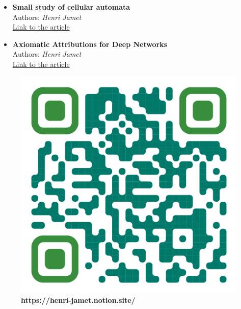 \begin{multicols}{2}
\begin{itemize}
  \item \textbf{Small study of cellular automata}\\
  Authors: \textit{Henri Jamet}\\
  \href{https://henri-jamet.notion.site/Small-study-of-cellular-automata-352e858c867e4cf3a960651f33738cb5}{Link to the article}
  
  \item \textbf{Axiomatic Attributions for Deep Networks}\\
  Authors: \textit{Henri Jamet}\\
  \href{https://henri-jamet.notion.site/Attributions-Axiomatiques-pour-les-R-seaux-Profonds-146fdf9f541b48738a7c60a2ad669ed8?pvs=4}{Link to the article}
\end{itemize}

\end{multicols}

\begin{figure}[h]
  \centering
  \begin{adjustbox}{max width=0.2\textwidth}
    \includegraphics{Img/QR.png}
  \end{adjustbox}
  \caption{\textbf{https://henri-jamet.notion.site/}}
\end{figure}